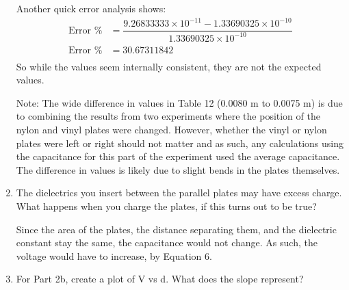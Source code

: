 \documentclass [12pt, letterpaper, twoside] {article}
\begin{document}
\begin{enumerate}
  Another quick error analysis shows:
  \begin{equation*}
    \begin{split}
      \text{Error \%} &= \dfrac{9.26833333\times10^{-11} - 1.33690325\times10^{-10}}{1.33690325\times10^{-10}} \\
      \text{Error \%} &= 30.67311842 \\
    \end{split}
  \end{equation*}
  So while the values seem internally consistent, they are not the expected values.

  Note: The wide difference in values in Table 12 (0.0080 m to 0.0075 m) is due to combining the results from two experiments where the position of the nylon and vinyl plates were changed. However, whether the vinyl or nylon plates were left or right should not matter and as such, any calculations using the capacitance for this part of the experiment used the average capacitance. The difference in values is likely due to slight bends in the plates themselves.
  \item The dielectrics you insert between the parallel plates may have excess charge.  What happens when you charge the plates, if this turns out to be true?

  Since the area of the plates, the distance separating them, and the dielectric constant stay the same, the capacitance would not change. As such, the voltage would have to increase, by Equation 6.
  \item For Part 2b, create a plot of V vs d.  What does the slope represent?


\end{enumerate}
\end{document}
